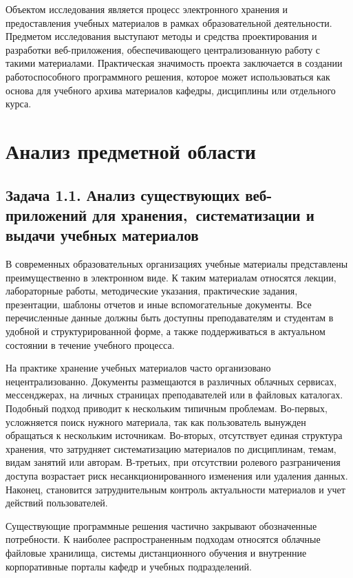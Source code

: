 \documentclass[14pt,a4paper]{extarticle}
\begin{document}
Объектом исследования является процесс электронного хранения и предоставления учебных материалов в рамках образовательной деятельности. Предметом исследования выступают методы и средства проектирования и разработки веб-приложения, обеспечивающего централизованную работу с такими материалами. Практическая значимость проекта заключается в создании работоспособного программного решения, которое может использоваться как основа для учебного архива материалов кафедры, дисциплины или отдельного курса.

\section{Анализ предметной области}

\subsection{Задача 1.1. Анализ существующих веб-приложений для хранения,\ систематизации и выдачи учебных материалов}

В современных образовательных организациях учебные материалы представлены преимущественно в электронном виде. К таким материалам относятся лекции, лабораторные работы, методические указания, практические задания, презентации, шаблоны отчетов и иные вспомогательные документы. Все перечисленные данные должны быть доступны преподавателям и студентам в удобной и структурированной форме, а также поддерживаться в актуальном состоянии в течение учебного процесса.

На практике хранение учебных материалов часто организовано нецентрализованно. Документы размещаются в различных облачных сервисах, мессенджерах, на личных страницах преподавателей или в файловых каталогах. Подобный подход приводит к нескольким типичным проблемам. Во-первых, усложняется поиск нужного материала, так как пользователь вынужден обращаться к нескольким источникам. Во-вторых, отсутствует единая структура хранения, что затрудняет систематизацию материалов по дисциплинам, темам, видам занятий или авторам. В-третьих, при отсутствии ролевого разграничения доступа возрастает риск несанкционированного изменения или удаления данных. Наконец, становится затруднительным контроль актуальности материалов и учет действий пользователей.

Существующие программные решения частично закрывают обозначенные потребности. К наиболее распространенным подходам относятся облачные файловые хранилища, системы дистанционного обучения и внутренние корпоративные порталы кафедр и учебных подразделений.
\end{document}
